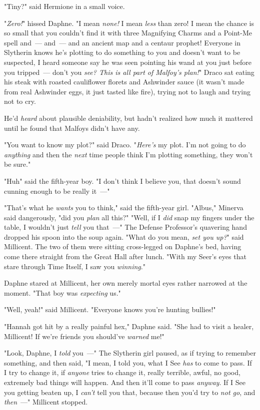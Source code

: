"Tiny?" said Hermione in a small voice.

"\emph{Zero!}" hissed Daphne. "I mean \emph{none!} I mean \emph{less} than
zero! I mean the chance is so small that you couldn't find it with three
Magnifying Charms and a Point-Me spell and~--- and~--- and an ancient map and a
centaur prophet! Everyone in Slytherin knows he's plotting to do something to
you and doesn't want to be suspected, I heard someone say he was seen pointing
his wand at you just before you tripped~--- don't you \emph{see? This is all part
of Malfoy's plan!}"
\sbreak
Draco sat eating his steak with roasted cauliflower florets and Ashwinder sauce
(it wasn't made from real Ashwinder eggs, it just tasted like fire), trying not
to laugh and trying not to cry.

He'd \emph{heard} about plausible deniability, but hadn't realized how much it
mattered until he found that Malfoys didn't have any.

"You want to know my plot?" said Draco. "\emph{Here's} my plot. I'm not going
to do \emph{anything} and then the \emph{next} time people think I'm plotting
something, they won't be sure."

"Huh{\el}" said the fifth-year boy. "I don't think I believe you, that
doesn't sound cunning enough to be really it~---"

"That's what he \emph{wants} you to think," said the fifth-year girl.
\sbreak
"Albus," Minerva said dangerously, "did you \emph{plan} all this?"
\sbreak
"Well, if I \emph{did} snap my fingers under the table, I wouldn't just
\emph{tell} you that~---"
\sbreak
The Defense Professor's quavering hand dropped his spoon into the soup again.
\sbreak
"What do you mean, \emph{set you up?}" said Millicent. The two of them were
sitting cross-legged on Daphne's bed, having come there straight from the Great
Hall after lunch. "With my Seer's eyes that stare through Time Itself, I saw
you \emph{winning}."

Daphne stared at Millicent, her own merely mortal eyes rather narrowed at the
moment. "That boy was \emph{expecting} us."

"Well, yeah!" said Millicent. "Everyone knows you're hunting bullies!"

"Hannah got hit by a really painful hex," Daphne said. "She had to visit a
healer, Millicent! If we're friends you should've \emph{warned} me!"

"Look, Daphne, I \emph{told} you~---" The Slytherin girl paused, as if trying to
remember something, and then said, "I mean, I told you, what I See \emph{has}
to come to pass. If I try to change it, if \emph{anyone} tries to change it,
really terrible, awful, no good, extremely bad things will happen. And then
it'll come to pass \emph{anyway}. If I See you getting beaten up, I
\emph{can't} tell you that, because then you'd try to \emph{not go}, and
\emph{then}~---" Millicent stopped.

